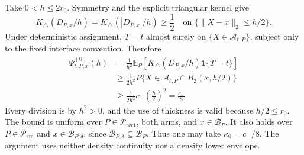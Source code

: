 Take \(0<h\leq2r_0\).  Symmetry and the explicit triangular kernel give
\[
 K_\triangle(D_{P,x}/h)=K_\triangle(|D_{P,x}|/h)\geq\frac12
 \quad\text{on }\{\lVert X-x\rVert_2\leq h/2\}.
\]
Under deterministic assignment, \(T=t\) almost surely on \(\{X\in\mathcal A_{t,P}\}\), subject only to the fixed interface convention.  Therefore
\[
\begin{aligned}
 \Psi^{(0)}_{t,P,x}(h)
 &=\frac1{h^2}\mathbb E_P\!\left[K_\triangle(D_{P,x}/h)\mathbf1\{T=t\}\right]\\
 &\geq\frac1{2h^2}P\{X\in\mathcal A_{t,P}\cap B_2(x,h/2)\}\\
 &\geq\frac1{2h^2}c_-\left(\frac h2\right)^2
 =\frac{c_-}{8}.
\end{aligned}
\]
Every division is by \(h^2>0\), and the use of thickness is valid because \(h/2\leq r_0\).  The bound is uniform over \(P\in\mathcal P_{\mathrm{rect}}\), both arms, and \(x\in\mathcal B_P\).  It also holds over \(P\in\mathcal P_{\mathrm{sm}}\) and \(x\in\mathcal B_{P,\delta}\), since \(\mathcal B_{P,\delta}\subseteq\mathcal B_P\).  Thus one may take \(\kappa_0=c_-/8\).  The argument uses neither density continuity nor a density lower envelope.